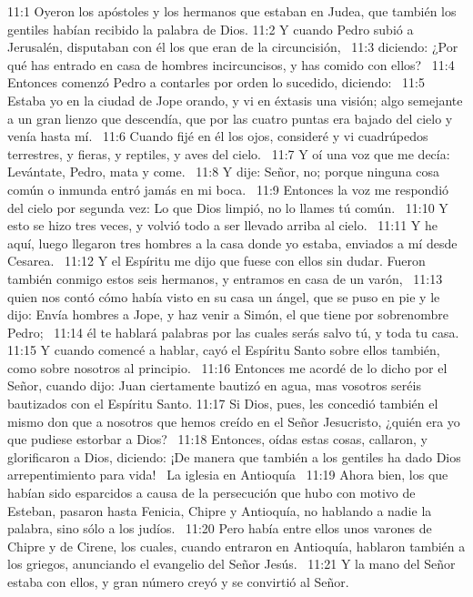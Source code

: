 11:1 Oyeron los apóstoles y los hermanos que estaban en Judea, que también los gentiles habían recibido la palabra de Dios. 
11:2 Y cuando Pedro subió a Jerusalén, disputaban con él los que eran de la circuncisión,  
11:3 diciendo: ¿Por qué has entrado en casa de hombres incircuncisos, y has comido con ellos?  
11:4 Entonces comenzó Pedro a contarles por orden lo sucedido, diciendo:  
11:5 Estaba yo en la ciudad de Jope orando, y vi en éxtasis una visión; algo semejante a un gran lienzo que descendía, que por las cuatro puntas era bajado del cielo y venía hasta mí.  
11:6 Cuando fijé en él los ojos, consideré y vi cuadrúpedos terrestres, y fieras, y reptiles, y aves del cielo.  
11:7 Y oí una voz que me decía: Levántate, Pedro, mata y come.  
11:8 Y dije: Señor, no; porque ninguna cosa común o inmunda entró jamás en mi boca.  
11:9 Entonces la voz me respondió del cielo por segunda vez: Lo que Dios limpió, no lo llames tú común.  
11:10 Y esto se hizo tres veces, y volvió todo a ser llevado arriba al cielo.  
11:11 Y he aquí, luego llegaron tres hombres a la casa donde yo estaba, enviados a mí desde Cesarea.  
11:12 Y el Espíritu me dijo que fuese con ellos sin dudar. Fueron también conmigo estos seis hermanos, y entramos en casa de un varón,  
11:13 quien nos contó cómo había visto en su casa un ángel, que se puso en pie y le dijo: Envía hombres a Jope, y haz venir a Simón, el que tiene por sobrenombre Pedro;  
11:14 él te hablará palabras por las cuales serás salvo tú, y toda tu casa.  
11:15 Y cuando comencé a hablar, cayó el Espíritu Santo sobre ellos también, como sobre nosotros al principio.  
11:16 Entonces me acordé de lo dicho por el Señor, cuando dijo: Juan ciertamente bautizó en agua, mas vosotros seréis bautizados con el Espíritu Santo. 
11:17 Si Dios, pues, les concedió también el mismo don que a nosotros que hemos creído en el Señor Jesucristo, ¿quién era yo que pudiese estorbar a Dios?  
11:18 Entonces, oídas estas cosas, callaron, y glorificaron a Dios, diciendo: ¡De manera que también a los gentiles ha dado Dios arrepentimiento para vida!  
La iglesia en Antioquía  
11:19 Ahora bien, los que habían sido esparcidos a causa de la persecución que hubo con motivo de Esteban, pasaron hasta Fenicia, Chipre y Antioquía, no hablando a nadie la palabra, sino sólo a los judíos.  
11:20 Pero había entre ellos unos varones de Chipre y de Cirene, los cuales, cuando entraron en Antioquía, hablaron también a los griegos, anunciando el evangelio del Señor Jesús.  
11:21 Y la mano del Señor estaba con ellos, y gran número creyó y se convirtió al Señor.  
